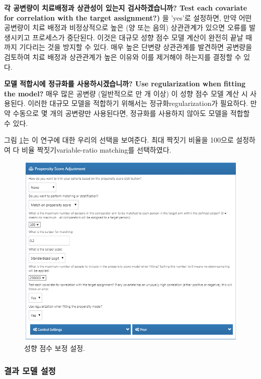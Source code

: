 \documentclass[10.5pt]{book}
\theoremstyle{definition}
\theoremstyle{definition}
\theoremstyle{definition}
\theoremstyle{remark}
\begin{document}
\textbf{각 공변량이 치료배정과 상관성이 있는지 검사하겠습니까? Test each
covariate for correlation with the target assignment?)} 을 'yes'로
설정하면, 만약 어떤 공변량이 치료 배정과 비정상적으로 높은 (양 또는
음의) 상관관계가 있으면 오류를 발생시키고 프로세스가 중단된다. 이것은
대규모 성향 점수 모델 계산이 완전히 끝날 때까지 기다리는 것을 방지할 수
있다. 매우 높은 단변량 상관관계를 발견하면 공변량을 검토하여 치료 배정과
상관관계가 높은 이유와 이를 제거해야 하는지를 결정할 수 있다.

\textbf{모델 적합시에 정규화를 사용하시겠습니까? Use regularization when
fitting the model?} 매우 많은 공변량 (일반적으로 만 개 이상) 이 성향
점수 모델 계산 시 사용된다. 이러한 대규모 모델을 적합하기 위해서는
정규화regularization가 필요하다. 만약 수동으로 몇 개의 공변량만
사용된다면, 정규화를 사용하지 않아도 모델을 적합할 수 있다.

그림 \ref{fig:psSettings}는 이 연구에 대한 우리의 선택을 보여준다. 최대
짝짓기 비율을 100으로 설정하여 다 비율 짝짓기variable-ratio matching를
선택하였다.

\begin{figure}

{\centering \includegraphics[width=1\linewidth]{images/PopulationLevelEstimation/psSettings} 

}

\caption{성향 점수 보정 설정.}\label{fig:psSettings}
\end{figure}

\subsubsection*{결과 모델 설정}\label{--}
\end{document}

